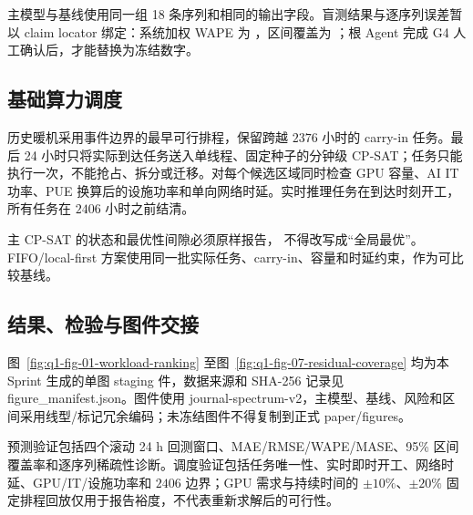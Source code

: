 主模型与基线使用同一组 18 条序列和相同的输出字段。盲测结果与逐序列误差暂以 claim locator 绑定：系统加权 WAPE 为 ，区间覆盖为 ；根 Agent 完成 G4 人工确认后，才能替换为冻结数字。

\subsection{基础算力调度}

历史暖机采用事件边界的最早可行排程，保留跨越 $2376$ 小时的 carry-in 任务。最后 24 小时只将实际到达任务送入单线程、固定种子的分钟级 CP-SAT；任务只能执行一次，不能抢占、拆分或迁移。对每个候选区域同时检查 GPU 容量、AI IT 功率、PUE 换算后的设施功率和单向网络时延。实时推理任务在到达时刻开工，所有任务在 $2406$ 小时之前结清。

主 CP-SAT 的状态和最优性间隙必须原样报告， 不得改写成“全局最优”。FIFO/local-first 方案使用同一批实际任务、carry-in、容量和时延约束，作为可比较基线。

\subsection{结果、检验与图件交接}

图~\ref{fig:q1-fig-01-workload-ranking} 至图~\ref{fig:q1-fig-07-residual-coverage} 均为本 Sprint 生成的单图 staging 件，数据来源和 SHA-256 记录见 figure\_manifest.json。图件使用 journal-spectrum-v2，主模型、基线、风险和区间采用线型/标记冗余编码；未冻结图件不得复制到正式 paper/figures。

预测验证包括四个滚动 24 h 回测窗口、MAE/RMSE/WAPE/MASE、95\% 区间覆盖率和逐序列稀疏性诊断。调度验证包括任务唯一性、实时即时开工、网络时延、GPU/IT/设施功率和 $2406$ 边界；GPU 需求与持续时间的 $\pm10\%$、$\pm20\%$ 固定排程回放仅用于报告裕度，不代表重新求解后的可行性。

